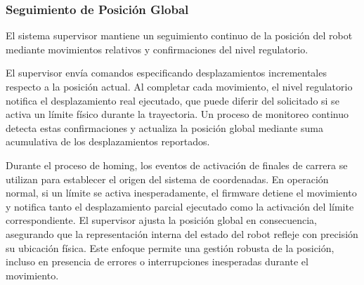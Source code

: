 \subsubsection{Seguimiento de Posición Global}

El sistema supervisor mantiene un seguimiento continuo de la posición del robot mediante movimientos relativos y confirmaciones del nivel regulatorio.

El supervisor envía comandos especificando desplazamientos incrementales respecto a la posición actual. Al completar cada movimiento, el nivel regulatorio notifica el desplazamiento real ejecutado, que puede diferir del solicitado si se activa un límite físico durante la trayectoria. Un proceso de monitoreo continuo detecta estas confirmaciones y actualiza la posición global mediante suma acumulativa de los desplazamientos reportados.

Durante el proceso de homing, los eventos de activación de finales de carrera se utilizan para establecer el origen del sistema de coordenadas. En operación normal, si un límite se activa inesperadamente, el firmware detiene el movimiento y notifica tanto el desplazamiento parcial ejecutado como la activación del límite correspondiente.
El supervisor ajusta la posición global en consecuencia, asegurando que la representación interna del estado del robot refleje con precisión su ubicación física. Este enfoque permite una gestión robusta de la posición, incluso en presencia de errores o interrupciones inesperadas durante el movimiento.
